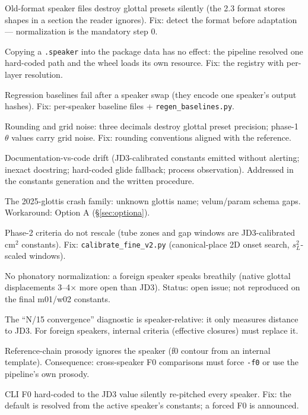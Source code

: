 \documentclass[11pt,a4paper]{article}
\newcommand{\speakerfile}[1]{\texttt{#1.speaker}}
\newcommand{\code}[1]{\texttt{#1}}
\begin{document}
\begin{description}[leftmargin=2.8em, itemsep=3pt, style=nextline]
\item[D1 ---] Old-format speaker files destroy glottal presets silently (the 2.3 format stores shapes in a section the reader ignores). Fix: detect the format before adaptation --- normalization is the mandatory step 0.
\item[D2 ---] Copying a \speakerfile{} into the package data has no effect: the pipeline resolved one hard-coded path and the wheel loads its own resource. Fix: the registry with per-layer resolution.
\item[D3 ---] Regression baselines fail after a speaker swap (they encode one speaker's output hashes). Fix: per-speaker baseline files + \code{regen\_baselines.py}.
\item[D4, D7 ---] Rounding and grid noise: three decimals destroy glottal preset precision; phase-1 $\theta$ values carry grid noise. Fix: rounding conventions aligned with the reference.
\item[D5, D6, D8, D9 ---] Documentation-vs-code drift (JD3-calibrated constants emitted without alerting; inexact docstring; hard-coded glide fallback; process observation). Addressed in the constants generation and the written procedure.
\item[D2-bis/ter ---] The 2025-glottis crash family: unknown glottis name; velum/param schema gaps. Workaround: Option A (\S\ref{sec:optiona}).
\item[D10 ---] Phase-2 criteria do not rescale (tube zones and gap windows are JD3-calibrated cm$^2$ constants). Fix: \code{calibrate\_fine\_v2.py} (canonical-place 2D onset search, $s_L^2$-scaled windows).
\item[D11 ---] No phonatory normalization: a foreign speaker speaks breathily (native glottal displacements 3--4$\times$ more open than JD3). Status: open issue; not reproduced on the final m01/w02 constants.
\item[D12 ---] The ``N/15 convergence'' diagnostic is speaker-relative: it only measures distance to JD3. For foreign speakers, internal criteria (effective closures) must replace it.
\item[D13 ---] Reference-chain prosody ignores the speaker (f0 contour from an internal template). Consequence: cross-speaker F0 comparisons must force \texttt{-f0} or use the pipeline's own prosody.
\item[D14 ---] CLI F0 hard-coded to the JD3 value silently re-pitched every speaker. Fix: the default is resolved from the active speaker's constants; a forced F0 is announced.

\end{description}
\end{document}
